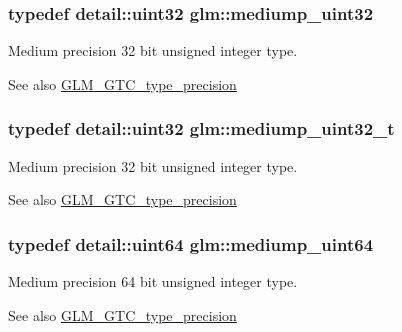 \subsubsection[{mediump\+\_\+uint32}]{\setlength{\rightskip}{0pt plus 5cm}typedef {\bf detail\+::uint32} {\bf glm\+::mediump\+\_\+uint32}}\label{group__gtc__type__precision_ga861dbd1051f488e425b3966001b568e5}
Medium precision 32 bit unsigned integer type. \begin{DoxySeeAlso}{See also}
\hyperlink{group__gtc__type__precision}{G\+L\+M\+\_\+\+G\+T\+C\+\_\+type\+\_\+precision} 
\end{DoxySeeAlso}
\hypertarget{group__gtc__type__precision_gac7782c1e393f9ad47e41a177a685f287}{}
\subsubsection[{mediump\+\_\+uint32\+\_\+t}]{\setlength{\rightskip}{0pt plus 5cm}typedef {\bf detail\+::uint32} {\bf glm\+::mediump\+\_\+uint32\+\_\+t}}\label{group__gtc__type__precision_gac7782c1e393f9ad47e41a177a685f287}
Medium precision 32 bit unsigned integer type. \begin{DoxySeeAlso}{See also}
\hyperlink{group__gtc__type__precision}{G\+L\+M\+\_\+\+G\+T\+C\+\_\+type\+\_\+precision} 
\end{DoxySeeAlso}
\hypertarget{group__gtc__type__precision_ga6685788d15d0a973ee7c2460d0456dc1}{}
\subsubsection[{mediump\+\_\+uint64}]{\setlength{\rightskip}{0pt plus 5cm}typedef detail\+::uint64 {\bf glm\+::mediump\+\_\+uint64}}\label{group__gtc__type__precision_ga6685788d15d0a973ee7c2460d0456dc1}
Medium precision 64 bit unsigned integer type. \begin{DoxySeeAlso}{See also}
\hyperlink{group__gtc__type__precision}{G\+L\+M\+\_\+\+G\+T\+C\+\_\+type\+\_\+precision} 
\end{DoxySeeAlso}
\hypertarget{group__gtc__type__precision_gaa97354d3120a6dc029a5e9563723de18}{}
